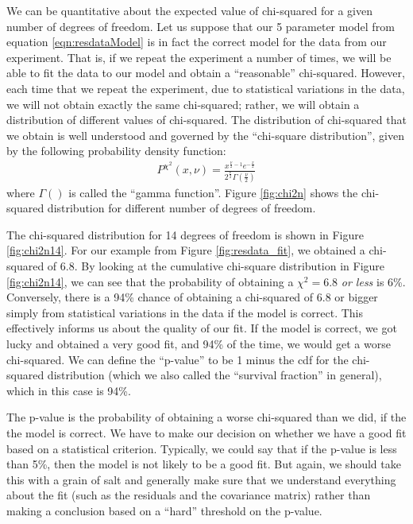 We can be quantitative about the expected value of chi-squared for a given number of degrees of freedom. Let us suppose that our 5 parameter model from equation \ref{eqn:resdataModel} is in fact the correct model for the data from our experiment. That is, if we repeat the experiment a number of times, we will be able to fit the data to our model and obtain a ``reasonable'' chi-squared. However, each time that we repeat the experiment, due to statistical variations in the data, we will not obtain exactly the same chi-squared; rather, we will obtain a distribution of different values of chi-squared. The distribution of chi-squared that we obtain is well understood and governed by the ``chi-square distribution'', given by the following probability density function:
\begin{align}
P^{\chi^2}(x,\nu)=\frac{x^{\frac{\nu}{2}-1}e^{-\frac{x}{2}}}{2^{\frac{\nu}{2}}\Gamma\left(\frac{\nu}{2}\right)}
\end{align}
where $\Gamma()$ is called the ``gamma function''. Figure \ref{fig:chi2n} shows the chi-squared distribution for different number of degrees of freedom.

The chi-squared distribution for 14 degrees of freedom is shown in Figure \ref{fig:chi2n14}. For our example from Figure \ref{fig:resdata_fit}, we obtained a chi-squared of 6.8. By looking at the cumulative chi-square distribution in Figure \ref{fig:chi2n14}, we can see that the probability of obtaining a $\chi^2=6.8$ \textit{or less} is 6\%. Conversely, there is a 94\% chance of obtaining a chi-squared of 6.8 or bigger simply from statistical variations in the data if the model is correct. This effectively informs us about the quality of our fit. If the model is correct, we got lucky and obtained a very good fit, and 94\% of the time, we would get a worse chi-squared. We can define the ``p-value'' to be 1 minus the cdf for the chi-squared distribution (which we also called the ``survival fraction'' in general), which in this case is 94\%.

The p-value is the probability of obtaining a worse chi-squared than we did, if the the model is correct. We have to make our decision on whether we have a good fit based on a statistical criterion. Typically, we could say that if the p-value is less than 5\%, then the model is not likely to be a good fit. But again, we should take this with a grain of salt and generally make sure that we understand everything about the fit (such as the residuals and the covariance matrix) rather than making a conclusion based on a ``hard'' threshold on the p-value.

